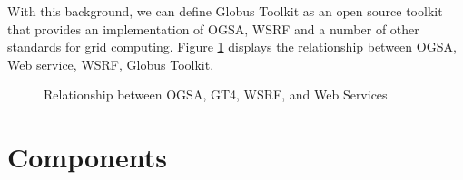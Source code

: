 \documentclass[9pt,twocolumn,twoside]{../../styles/osajnl}
\begin{document}
With this background, we can define Globus Toolkit as an open source toolkit that provides an implementation of OGSA, WSRF and a number of other standards for grid computing. Figure \ref{fig:relation} displays the relationship between OGSA, Web service, WSRF, Globus Toolkit.
\begin{figure}[htbp]
\centering
{}
\caption{Relationship between OGSA, GT4, WSRF, and Web Services \cite{sotomayor2006globus}}
\label{fig:relation}
\end{figure}

\section{Components} 
\end{document}
